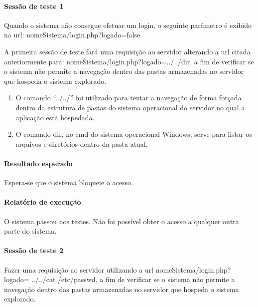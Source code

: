 \documentclass[
    12pt,               %
    openright,          %
    oneside,            %
    a4paper,            %
    section=TITLE,     %
    english,            %
    french,             %
    spanish,            %
    brazil              %
    ]{abntex2}
\begin{document}
\paragraph*{Sessão de teste 1}

Quando o sistema não consegue efetuar um login, o seguinte parâmetro é exibido na url: nomeSistema/login.php?logado=false.


A primeira sessão de teste fará uma requisição ao servidor alterando a url citada anteriormente para: nomeSistema/login.php?logado=../../dir, a fim de verificar se o sistema não permite a navegação dentro das pastas armazenadas no servidor que hospeda o sistema explorado.



\begin{enumerate}[start=1]
	
\item 
	O comando \textquotedblleft{}../../\textquotedblright{} foi utilizado para tentar a navegação de forma forçada dentro da estrutura de pastas do sistema operacional do servidor no qual a aplicação está hospedada.

	
	
\item 
	O comando dir, no cmd do sistema operacional Windows, serve para listar os arquivos e diretórios dentro da pasta atual.

	

\end{enumerate}


\paragraph*{Resultado esperado}

Espera-se que o sistema bloqueie o acesso.



\paragraph*{Relatório de execução}

O sistema passou nos testes. Não foi possível obter o acesso a qualquer outra parte do sistema.



\paragraph*{Sessão de teste 2}

Fazer uma requisição ao servidor utilizando a url nomeSistema/login.php?logado= ../../cat /etc/passwd, a fim de verificar se o sistema não permite a navegação dentro das pastas armazenadas no servidor que hospeda o sistema explorado.
\end{document}
